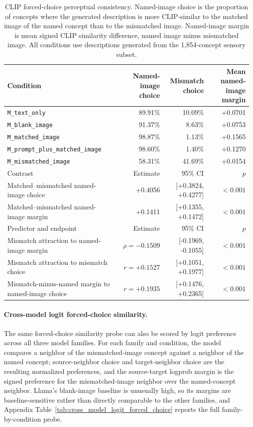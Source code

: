 \documentclass{article}
\begin{document}
\begin{table}[!htbp]
\centering
\caption{CLIP forced-choice perceptual consistency. Named-image choice is the proportion of concepts where the generated description is more CLIP-similar to the matched image of the named concept than to the mismatched image. Named-image margin is mean signed CLIP similarity difference, named image minus mismatched image. All conditions use descriptions generated from the 1,854-concept sensory subset.}
\label{tab:clip_forced_choice}
\scriptsize
\begin{tabular}{lrrr}
\toprule
Condition & Named-image choice & Mismatch choice & Mean named-image margin \\
\midrule
\texttt{M\_text\_only} & 89.91\% & 10.09\% & +0.0701 \\
\texttt{M\_blank\_image} & 91.37\% & 8.63\% & +0.0753 \\
\texttt{M\_matched\_image} & 98.87\% & 1.13\% & +0.1565 \\
\texttt{M\_prompt\_plus\_matched\_image} & 98.60\% & 1.40\% & +0.1270 \\
\texttt{M\_mismatched\_image} & 58.31\% & 41.69\% & +0.0154 \\
\midrule
Contrast & Estimate & 95\% CI & \(p\) \\
\midrule
Matched--mismatched named-image choice & +0.4056 & [+0.3824, +0.4277] & \(<0.001\) \\
Matched--mismatched named-image margin & +0.1411 & [+0.1355, +0.1472] & \(<0.001\) \\
\midrule
Predictor and endpoint & Estimate & 95\% CI & \(p\) \\
\midrule
Mismatch attraction to named-image margin & \(\rho=-0.1509\) & [-0.1969, -0.1055] & \(<0.001\) \\
Mismatch attraction to mismatch choice & \(r=+0.1527\) & [+0.1051, +0.1977] & \(<0.001\) \\
Mismatch-minus-named margin to named-image choice & \(r=+0.1935\) & [+0.1476, +0.2365] & \(<0.001\) \\
\bottomrule
\end{tabular}
\end{table}

\paragraph{Cross-model logit forced-choice similarity.}
The same forced-choice similarity probe can also be scored by logit preference across all three model families. For each family and condition, the model compares a neighbor of the mismatched-image concept against a neighbor of the named concept; source-neighbor choice and target-neighbor choice are the resulting normalized preferences, and the source-target logprob margin is the signed preference for the mismatched-image neighbor over the named-concept neighbor. Llama's blank-image baseline is unusually high, so its margins are baseline-sensitive rather than directly comparable to the other families, and Appendix Table~\ref{tab:cross_model_logit_forced_choice} reports the full family-by-condition probe.
\end{document}
